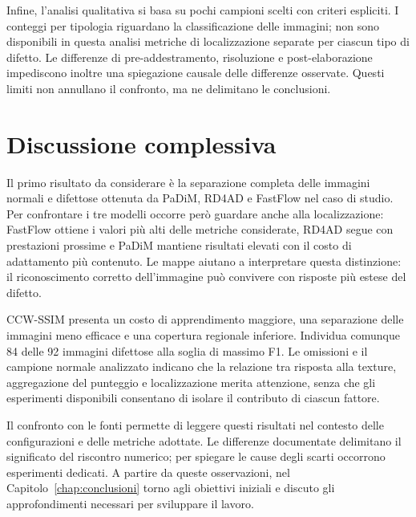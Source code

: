 Infine, l'analisi qualitativa si basa su pochi campioni scelti con criteri espliciti. I conteggi per tipologia riguardano la classificazione delle immagini; non sono disponibili in questa analisi metriche di localizzazione separate per ciascun tipo di difetto. Le differenze di pre-addestramento, risoluzione e post-elaborazione impediscono inoltre una spiegazione causale delle differenze osservate. Questi limiti non annullano il confronto, ma ne delimitano le conclusioni.

\section{Discussione complessiva}

Il primo risultato da considerare è la separazione completa delle immagini normali e difettose ottenuta da PaDiM, RD4AD e FastFlow nel caso di studio. Per confrontare i tre modelli occorre però guardare anche alla localizzazione: FastFlow ottiene i valori più alti delle metriche considerate, RD4AD segue con prestazioni prossime e PaDiM mantiene risultati elevati con il costo di adattamento più contenuto. Le mappe aiutano a interpretare questa distinzione: il riconoscimento corretto dell'immagine può convivere con risposte più estese del difetto.

CCW-SSIM presenta un costo di apprendimento maggiore, una separazione delle immagini meno efficace e una copertura regionale inferiore. Individua comunque 84 delle 92 immagini difettose alla soglia di massimo F1. Le omissioni e il campione normale analizzato indicano che la relazione tra risposta alla texture, aggregazione del punteggio e localizzazione merita attenzione, senza che gli esperimenti disponibili consentano di isolare il contributo di ciascun fattore.

Il confronto con le fonti permette di leggere questi risultati nel contesto delle configurazioni e delle metriche adottate. Le differenze documentate delimitano il significato del riscontro numerico; per spiegare le cause degli scarti occorrono esperimenti dedicati. A partire da queste osservazioni, nel Capitolo~\ref{chap:conclusioni} torno agli obiettivi iniziali e discuto gli approfondimenti necessari per sviluppare il lavoro.
